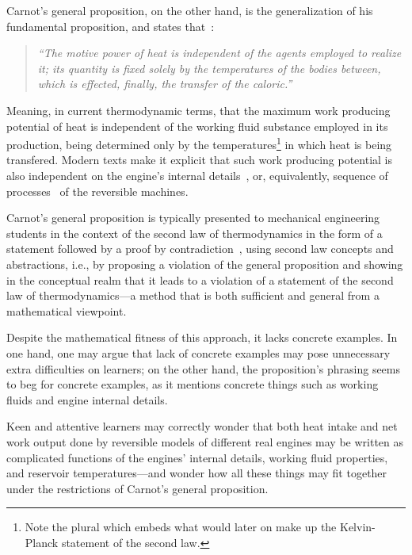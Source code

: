     Carnot's general proposition, on the other hand, is the generalization  of  his  fundamental
    proposition, and states that~\cite[p.~68]{1897-ThurstonRH-Wiley}:

    \begin{quote}
        \it
        ``The motive power of heat is independent of the agents employed
        to realize it; its quantity is fixed solely by the  temperatures
        of the bodies between, which is effected, finally, the  transfer
        of the caloric.''
    \end{quote}

    Meaning, in current thermodynamic terms, that the maximum work producing potential  of  heat
    is independent of the working fluid substance employed in its production,  being  determined
    only by the temperatures\footnote{Note the plural which embeds what would later on  make  up
    the Kelvin-Planck statement of the second law.} in which heat is  being  transfered.  Modern
    texts make it explicit that such  work  producing  potential  is  also  independent  on  the
    engine's internal details~\cite{2013-CengelYA+BolesMA-AMGH}, or, equivalently,  sequence  of
    processes~\cite{2002-MoranMJ+ShapiroHN-LTC} of the reversible machines.

    Carnot's general proposition is typically presented to mechanical  engineering  students  in
    the context of the second law of thermodynamics in the form of a  statement  followed  by  a
    proof   by    contradiction~\cite{2013-CengelYA+BolesMA-AMGH,    2002-MoranMJ+ShapiroHN-LTC,
    1986-JonesJB+HawkinsGA-Wiley},  using  second  law  concepts  and  abstractions,  i.e.,   by
    proposing a violation of the general proposition and showing in the conceptual realm that it
    leads to a violation of a statement of the second law of thermodynamics---a method  that  is
    both sufficient and general from a mathematical viewpoint.

    Despite the mathematical fitness of this approach, it lacks concrete examples. In one  hand,
    one may argue that lack of concrete examples may  pose  unnecessary  extra  difficulties  on
    learners; on the other hand, the proposition's phrasing seems to beg for concrete  examples,
    as it mentions concrete things such as working fluids and engine internal details.

    Keen and attentive learners may correctly wonder that both heat intake and net  work  output
    done by reversible models of different real engines may be written as complicated  functions
    of the engines' internal details, working fluid properties, and reservoir temperatures---and
    wonder how all these things may fit together under  the  restrictions  of  Carnot's  general
    proposition.

